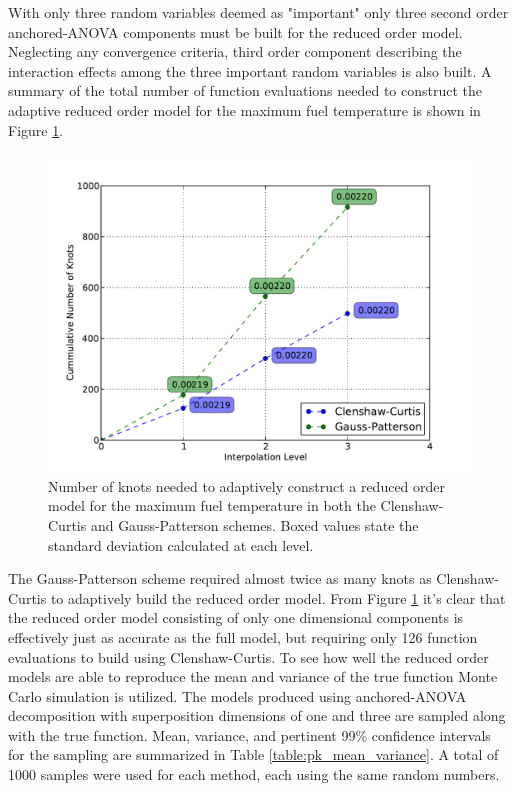With only three random variables deemed as "important" only three second order anchored-\ac{ANOVA} components must be built for the reduced order model. Neglecting any convergence criteria, third order component describing the interaction effects among the three important random variables is also built. A summary of the total number of function evaluations needed to construct the adaptive reduced order model for the maximum fuel temperature is shown in Figure \ref{fig:pk_sparse_grid_numknots}.          
\begin{figure}[!htb]
\caption[Cumulative number of knots for constructing a reduced order model of the maximum fuel temperature in the point kinetics/lumped thermal hydraulics model.]{\label{fig:pk_sparse_grid_numknots}
Number of knots needed to adaptively construct a reduced order model for the maximum fuel temperature in both the Clenshaw-Curtis and Gauss-Patterson schemes. Boxed values state the standard deviation calculated at each level.  
}
 \begin{center}
  \includegraphics[scale=.75]{./Chapter3/pk_sparse_grid_numknots.pdf}
 \end{center}
\end{figure}
The Gauss-Patterson scheme required almost twice as many knots as Clenshaw-Curtis to adaptively build the reduced order model. From Figure \ref{fig:pk_sparse_grid_numknots} it's clear that the reduced order model consisting of only one dimensional components is effectively just as accurate as the full model, but requiring only 126 function evaluations to build using Clenshaw-Curtis. To see how well the reduced order models are able to reproduce the mean and variance of the true function Monte Carlo simulation is utilized. The models produced using anchored-\ac{ANOVA} decomposition with superposition dimensions of one and three are sampled along with the true function. Mean, variance, and pertinent 99\% confidence intervals for the sampling are summarized in Table \ref{table:pk_mean_variance}. A total of 1000 samples were used for each method, each using the same random numbers.      
